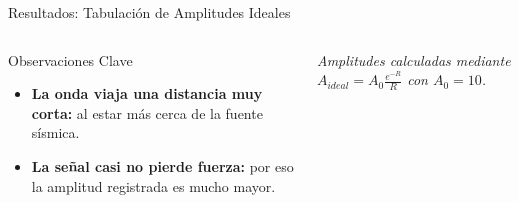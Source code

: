 \begin{frame}{Resultados: Tabulación de Amplitudes Ideales}
\begin{columns}[T]
\begin{block}{Observaciones Clave}
\begin{itemize}
                \vspace{0.4cm}
                
                \item \textbf{La onda viaja una distancia muy corta:} 
                al estar más cerca de la fuente sísmica.
                
                \vspace{0.4cm}
                
                \item \textbf{La señal casi no pierde fuerza:} 
                por eso la amplitud registrada es mucho mayor.
            \end{itemize}
        \end{block}

        \vspace{0.6cm}
        \begin{center}
            \tiny \textit{Amplitudes calculadas mediante 
            $A_{ideal} = A_0 \frac{e^{-R}}{R}$ con $A_0=10$.}
        \end{center}
    \end{columns}

\end{frame}